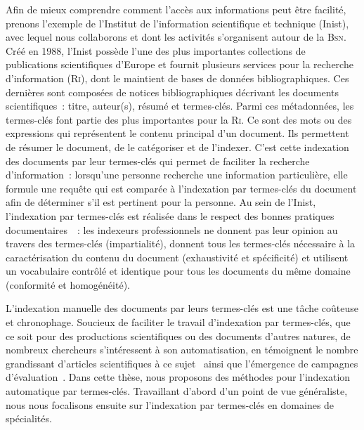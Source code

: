     Afin de mieux comprendre comment l'accès aux informations peut être
    facilité, prenons l'exemple de l'Institut de l'information scientifique et
    technique (Inist), avec lequel nous collaborons et dont les activités
    s'organisent autour de la \textsc{Bsn}. Créé en 1988, l'Inist possède l'une
    des plus importantes collections de publications scientifiques d'Europe et
    fournit plusieurs services pour la recherche d'information (\textsc{Ri}),
    dont le maintient de bases de données bibliographiques. Ces dernières sont
    composées de notices bibliographiques décrivant les documents
    scientifiques~: titre, auteur(s), résumé et termes-clés. Parmi ces
    métadonnées, les termes-clés font partie des plus importantes pour la
    \textsc{Ri}. Ce sont des mots ou des expressions qui représentent le contenu
    principal d'un document. Ils permettent de résumer le document, de le
    catégoriser et de l'indexer. C'est cette indexation des documents par leur
    termes-clés qui permet de faciliter la recherche d'information~: lorsqu'une
    personne recherche une information particulière, elle formule une requête qui
    est comparée à l'indexation par termes-clés du document afin de déterminer
    s'il est pertinent pour la personne. Au sein de l'Inist, l'indexation par
    termes-clés est réalisée dans le respect des bonnes pratiques
    documentaires~\cite{guinchat1996techniquesdocumentaires}~: les indexeurs
    professionnels ne donnent pas leur opinion au travers des termes-clés
    (impartialité), donnent tous les termes-clés nécessaire à la caractérisation
    du contenu du document (exhaustivité et spécificité) et utilisent un
    vocabulaire contrôlé et identique pour tous les documents du même domaine
    (conformité et homogénéité). 

    L'indexation manuelle des documents par leurs termes-clés est une tâche
    coûteuse et chronophage. Soucieux de faciliter le travail d'indexation par
    termes-clés, que ce soit pour des productions scientifiques ou des documents
    d'autres natures, de nombreux chercheurs s'intéressent à son automatisation,
    en témoignent le nombre grandissant d'articles scientifiques à ce
    sujet~\cite{hasan2014state_of_the_art} ainsi que l'émergence de campagnes
    d'évaluation~\cite{kim2010semeval,paroubek2012deft}. Dans cette thèse, nous
    proposons des méthodes pour l'indexation automatique par termes-clés.
    Travaillant d'abord d'un point de vue généraliste, nous nous focalisons
    ensuite sur l'indexation par termes-clés en domaines de spécialités.

